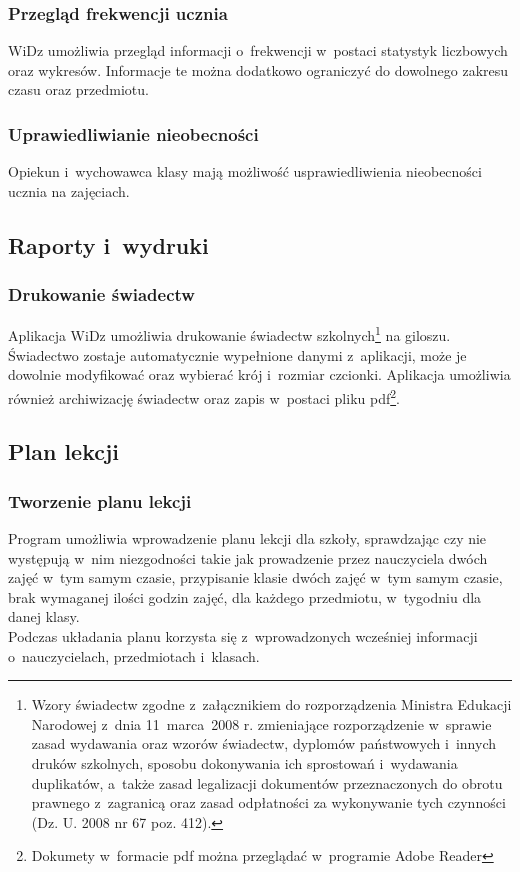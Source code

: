 \documentclass[12pt,leqno,twoside]{mwart}
\begin{document}
\subsubsection{Przegląd frekwencji ucznia}
\noindent WiDz umożliwia przegląd informacji o~frekwencji w~postaci statystyk liczbowych oraz wykresów. Informacje te można dodatkowo ograniczyć do dowolnego zakresu czasu oraz przedmiotu.

\subsubsection{Uprawiedliwianie nieobecności}
\noindent Opiekun i~wychowawca klasy mają możliwość usprawiedliwienia nieobecności ucznia na zajęciach.

\subsection{Raporty i~wydruki}
\subsubsection{Drukowanie świadectw} 
\noindent Aplikacja WiDz umożliwia drukowanie świadectw szkolnych\footnote{Wzory świadectw zgodne z~załącznikiem do rozporządzenia Ministra Edukacji Narodowej z~dnia 11~marca~2008 r. zmieniające rozporządzenie w~sprawie zasad wydawania oraz wzorów świadectw, dyplomów państwowych i~innych druków szkolnych, sposobu dokonywania ich sprostowań i~wydawania duplikatów, a~także zasad legalizacji dokumentów przeznaczonych do obrotu prawnego z~zagranicą oraz zasad odpłatności za wykonywanie tych czynności (Dz. U. 2008 nr 67 poz. 412).} na giloszu. Świadectwo zostaje automatycznie wypełnione danymi z~aplikacji, może je dowolnie modyfikować oraz wybierać krój i~rozmiar czcionki. Aplikacja umożliwia również archiwizację świadectw oraz zapis w~postaci pliku pdf\footnote{Dokumety w~formacie pdf można przeglądać w~programie Adobe Reader}.

\subsection{Plan lekcji}
\subsubsection{Tworzenie planu lekcji}
\noindent Program umożliwia wprowadzenie planu lekcji dla szkoły, sprawdzając czy nie występują w~nim niezgodności takie jak prowadzenie przez nauczyciela dwóch zajęć w~tym samym czasie, przypisanie klasie dwóch zajęć w~tym samym czasie, brak wymaganej ilości godzin zajęć, dla każdego przedmiotu, w~tygodniu dla danej klasy.\\
\indent Podczas układania planu korzysta się z~wprowadzonych wcześniej informacji o~nauczycielach, przedmiotach i~klasach.
\end{document}
